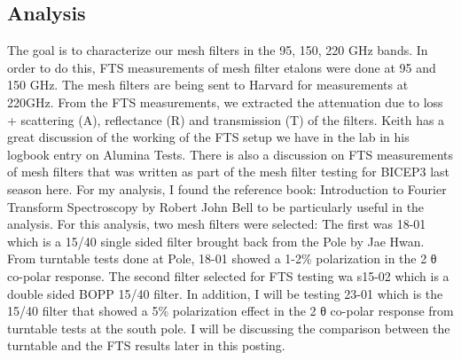 \documentclass[12pt]{article}
\begin{document}
\subsection{Analysis} 
The goal is to characterize our mesh filters in the 95, 150, 220 GHz bands. In order to do this, FTS measurements of mesh filter etalons were done at 95 and 150 GHz. The mesh filters are being sent to Harvard for measurements at 220GHz. From the FTS measurements, we extracted the attenuation due to loss + scattering (A), reflectance (R) and transmission (T) of the filters. Keith has a great discussion of the working of the FTS setup we have in the lab in his logbook entry on Alumina Tests. There is also a discussion on FTS measurements of mesh filters that was written as part of the mesh filter testing for BICEP3 last season here. For my analysis, I found the reference book: Introduction to Fourier Transform Spectroscopy by Robert John Bell to be particularly useful in the analysis.
For this analysis, two mesh filters were selected: The first was 18-01 which is a 15/40 single sided filter brought back from the Pole by Jae Hwan. From turntable tests done at Pole, 18-01 showed a 1-2\% polarization in the 2 θ co-polar response. The second filter selected for FTS testing wa s15-02 which is a double sided BOPP 15/40 filter. In addition, I will be testing 23-01 which is the 15/40 filter that showed a 5\% polarization effect in the 2 θ co-polar response from turntable tests at the south pole. I will be discussing the comparison between the turntable and the FTS results later in this posting.
\end{document}
